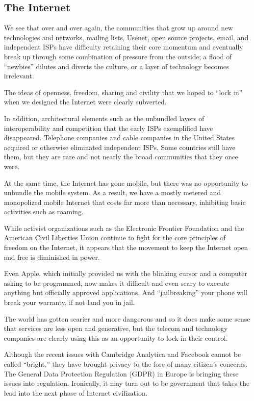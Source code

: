 \subsection{The Internet}

We see that over and over again, the communities that grow up around new technologies and networks, mailing lists, Usenet, open source projects, email, and independent ISPs have difficulty retaining their core momentum and eventually break up through some combination of pressure from the outside; a flood of ``newbies'' dilutes and diverts the culture, or a layer of technology becomes irrelevant.

The ideas of openness, freedom, sharing and civility that we hoped to ``lock in'' when we designed the Internet were clearly subverted.

In addition, architectural elements such as the unbundled layers of interoperability and competition that the early ISPs exemplified have disappeared. Telephone companies and cable companies in the United States acquired or otherwise eliminated independent ISPs. Some countries still have them, but they are rare and not nearly the broad communities that they once were.

At the same time, the Internet has gone mobile, but there was no opportunity to unbundle the mobile system. As a result, we have a mostly metered and monopolized mobile Internet that costs far more than necessary, inhibiting basic activities such as roaming.

While activist organizations such as the Electronic Frontier Foundation and the American Civil Liberties Union continue to fight for the core principles of freedom on the Internet, it appears that the movement to keep the Internet open and free is diminished in power.

Even Apple, which initially provided us with the blinking cursor and a computer asking to be programmed, now makes it difficult and even scary to execute anything but officially approved applications. And ``jailbreaking'' your phone will break your warranty, if not land you in jail.

The world has gotten scarier and more dangerous and so it does make some sense that services are less open and generative, but the telecom and technology companies are clearly using this as an opportunity to lock in their control.

Although the recent issues with Cambridge Analytica and Facebook cannot be called ``bright,'' they have brought privacy to the fore of many citizen's concerns. The General Data Protection Regulation (GDPR) in Europe is bringing these issues into regulation. Ironically, it may turn out to be government that takes the lead into the next phase of Internet civilization.

